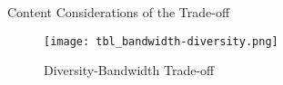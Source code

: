\begin{frame}{\color{violet} Content Considerations of the Trade-off}

  \begin{figure}
    \centering
    \texttt{[image: tbl\_bandwidth-diversity.png]}
    \caption{Diversity-Bandwidth Trade-off}
  \end{figure}


\end{frame}

